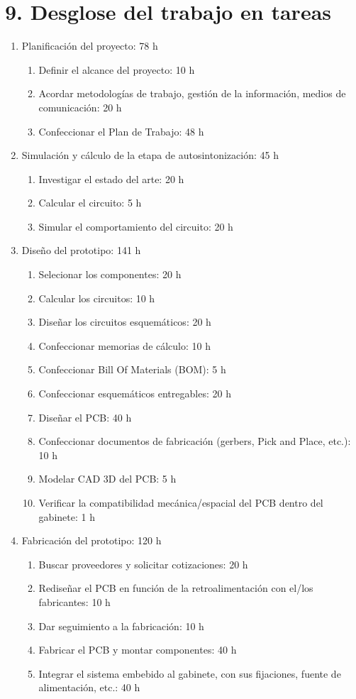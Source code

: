 \documentclass[
11pt, %
]{charter}
\begin{document}
\section{9. Desglose del trabajo en tareas}
\label{sec:wbs}

\begin{enumerate}
\item Planificación del proyecto: 78 h
	\begin{enumerate}
	\item Definir el alcance del proyecto: 10 h
	\item Acordar metodologías de trabajo, gestión de la información, medios de comunicación: 20 h
	\item Confeccionar el Plan de Trabajo: 48 h
	\end{enumerate}

\item Simulación y cálculo de la etapa de autosintonización: 45 h
	\begin{enumerate}
	\item Investigar el estado del arte: 20 h
	\item Calcular el circuito: 5 h
	\item Simular el comportamiento del circuito: 20 h 
	\end{enumerate}
	
\item Diseño del prototipo: 141 h
	\begin{enumerate}
	\item Selecionar los componentes: 20 h
	\item Calcular los circuitos: 10 h
	\item Diseñar los circuitos esquemáticos: 20 h
	\item Confeccionar memorias de cálculo: 10 h
	\item Confeccionar Bill Of Materials (BOM): 5 h
	\item Confeccionar esquemáticos entregables: 20 h
	\item Diseñar el PCB: 40 h
	\item Confeccionar documentos de fabricación (gerbers, Pick and Place, etc.): 10 h
	\item Modelar CAD 3D del PCB: 5 h
	\item Verificar la compatibilidad mecánica/espacial del PCB dentro del gabinete: 1 h
	\end{enumerate}
	
\item Fabricación del prototipo: 120 h
	\begin{enumerate}
	\item Buscar proveedores y solicitar cotizaciones: 20 h
	\item Rediseñar el PCB en función de la retroalimentación con el/los fabricantes: 10 h
	\item Dar seguimiento a la fabricación: 10 h
	\item Fabricar el PCB y montar componentes: 40 h
	\item Integrar el sistema embebido al gabinete, con sus fijaciones, fuente de alimentación, etc.: 40 h
    \end{enumerate}
    

\end{enumerate}
\end{document}
